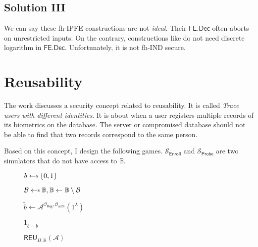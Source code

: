 \subsection{Solution III}

We can say these fh-IPFE constructions \cite{cryptoeprint:2015/1255, 10.1007/978-3-319-45871-7_24, cryptoeprint:2016/440} are not \emph{ideal}. Their $\textsf{FE.Dec}$ often aborts on unrestricted inputs. On the contrary, constructions like \cite{10.1007/978-3-030-90567-5_33} do not need discrete logarithm in $\textsf{FE.Dec}$. Unfortunately, it is not \textsf{fh-IND} secure.


\newpage


\section{Reusability}

The work \cite{simoens2012framework} discusses a security concept related to reusability. It is called \emph{Trace users with different identities}. It is about when a user registers multiple records of its biometrics on the database. The server or compromised database should not be able to find that two records correspond to the same person.

Based on this concept, I design the following games. $\mathcal{S}_{\textsf{Enroll}}$ and $\mathcal{S}_{\textsf{Probe}}$ are two simulators that do not have access to $\mathbb{B}$.

\begin{figure}[H]
\centering

	\begin{minipage}[t]{0.45\textwidth}
	\begin{algorithm}[H]
	\caption{$\textsf{REU}_{\Pi, \mathbb{B}}(\mathcal{A})$}
	\begin{algorithmic}[1]
		\State $b \getsdollar \{0, 1\}$

		\State $\mathcal{B} \getsdollar \mathbb{B}, \mathbb{B} \gets \mathbb{B} \setminus \mathcal{B}$

		\State $\tilde{b} \gets \mathcal{A}^{\mathcal{O}_{\textsf{Reg}}, \mathcal{O}_{\textsf{auth}}}(1^\lambda)$
 
		\State \Return $1_{\tilde{b} = b}$
	\end{algorithmic}
	\end{algorithm}
	\end{minipage}

\end{figure}

